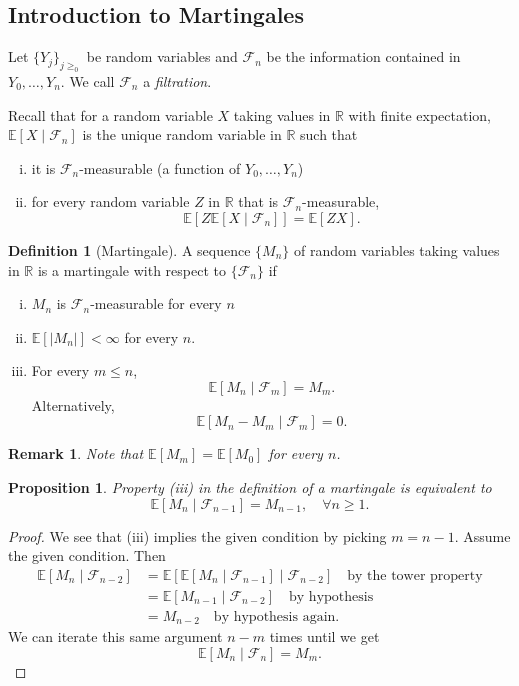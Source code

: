 \documentclass{tufte-handout}
\newcommand*\R{\mathbb{R}}
\newcommand*\E{\mathbb{E}}
\newtheorem{rmk}[thm]{Remark}
\newtheorem{prop}[thm]{Proposition}
\theoremstyle{definition}
\newtheorem{defn}[thm]{Definition}
\begin{document}
\subsection{Introduction to Martingales}

Let $\{Y_j\}_{j\ge_0}$ be random variables and $\mathscr{F}_n$ be the information contained in $Y_0,\ldots,Y_n$. We call $\mathscr{F}_n$ a \emph{filtration}.

Recall that for a random variable $X$ taking values in $\R$ with finite expectation, $\E\left[X \mid \mathscr{F}_n\right] $ is the unique random variable in $\R$ such that 
\begin{enumerate}[(i)]
	\item it is $\mathscr{F}_n$-measurable (a function of $Y_0,\ldots,Y_n$)
	\item for every random variable $Z$ in $\R$ that is $\mathscr{F}_n$-measurable, \[
		\E\left[Z \E\left[X \mid \mathscr{F}_n\right] \right] = \E\left[ZX\right] 
	.\] 
\end{enumerate}

\begin{defn}[Martingale]
	A sequence $\{M_n\}$ of random variables taking values in $\R$ is a martingale with respect to $\{\mathscr{F}_n\}$ if 
	\begin{enumerate}[(i)]
		\item $M_n$ is $\mathscr{F}_n$-measurable for every $n$
		\item $\E\left[\left| M_n \right|\right] < \infty$ for every $n$.
		\item For every $m \le n$, \[
			\E\left[M_n \mid \mathscr{F}_m \right] = M_m.\] Alternatively, \[ \E\left[M_n - M_m \mid \mathscr{F}_m\right] = 0
		.\] 
	\end{enumerate}
\end{defn}

\begin{rmk}
	Note that $\E\left[M_m\right] = \E\left[M_0\right]$ for every $n$.
\end{rmk}

\begin{prop}
	Property (iii) in the definition of a martingale is equivalent to \[
		\E\left[M_n \mid \mathscr{F}_{n-1}\right] = M_{n-1}, \quad \forall  n \ge 1
	.\] 
\end{prop}
\begin{proof}
	We see that (iii) implies the given condition by picking $m = n-1$. Assume the given condition. Then
	\begin{align*}
		\E\left[M_n \mid \mathscr{F}_{n-2}\right] &= \E\left[ \E\left[M_n \mid \mathscr{F}_{n-1}\right] \mid \mathscr{F}_{n-2}\right] \quad \text{by the tower property} \\
		&= \E\left[M_{n-1} \mid \mathscr{F}_{n-2}\right] \quad \text{by hypothesis} \\
		&= M_{n-2} \quad \text{by hypothesis again}
	.\end{align*}
	We can iterate this same argument $n-m$ times until we get \[
		\E\left[M_n \mid \mathscr{F}_n\right] = M_m
	.\] 
\end{proof}
\end{document}
